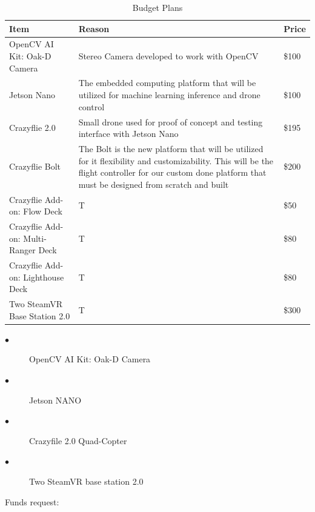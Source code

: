\documentclass[12pt,onecolumn]{IEEEtran}			%
\begin{document}
\begin{table}[h!]
\begin{center}
\begin{tabular}{| m{3cm} | m{13cm}| m{1cm} |} 
 \hline
  Item & Reason  & Price \\
 \hline
 OpenCV AI Kit: Oak-D Camera & Stereo Camera developed to work with OpenCV  & \$100 \\
 \hline
 Jetson Nano & The embedded computing platform that will be utilized for machine learning inference and drone control  & \$100 \\
 \hline
 Crazyflie 2.0 & Small drone used for proof of concept and testing interface with Jetson Nano & \$195 \\
 \hline
 Crazyflie Bolt & The Bolt is the new platform that will be utilized for it flexibility and customizability. This will be the flight controller for our custom done platform that must be designed from scratch and built & \$200 \\
 \hline
 Crazyflie Add-on: Flow Deck & T & \$50 \\
 \hline
 Crazyflie Add-on: Multi-Ranger Deck & T & \$80 \\
 \hline
 Crazyflie Add-on: Lighthouse Deck & T & \$80 \\
 \hline
 Two SteamVR Base Station 2.0 & T & \$300 \\
 \hline
\end{tabular}
\end{center}
\caption{Budget Plans}
\label{Inventory Table:2}
\end{table}

 \begin{description}
  \item[$\bullet$ ] OpenCV AI Kit: Oak-D Camera
  \item[$\bullet$ ] Jetson NANO
  \item[$\bullet$ ] Crazyfile 2.0 Quad-Copter
  \item[$\bullet$ ] Two SteamVR base station 2.0
\end{description}

\vspace{12pt} 

Funds request:
\end{document}
